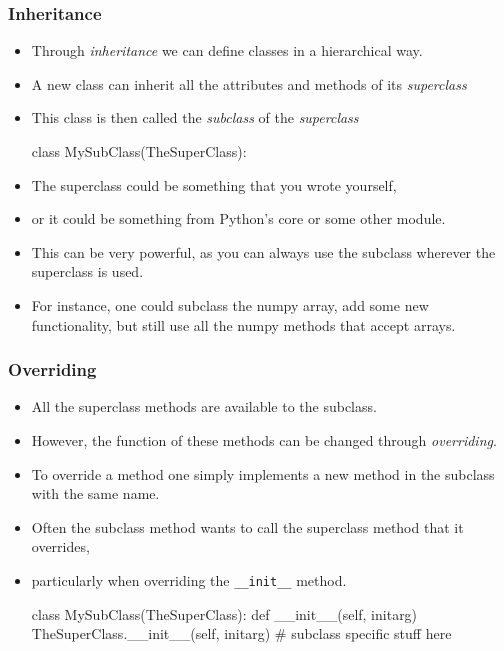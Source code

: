 \documentclass{beamer}
\begin{document}
\begin{frame}[fragile]
\frametitle{Inheritance}
\begin{itemize}
\item Through \emph{inheritance} we can define classes in a hierarchical way.
\item A new class can inherit all the attributes and methods of its \emph{superclass}
\item This class is then called the \emph{subclass} of the \emph{superclass}
\begin{code}
  class MySubClass(TheSuperClass):
\end{code}
\item The superclass could be something that you wrote yourself,
\item or it could be something from Python's core or some other module.
\item This can be very powerful, as you can always use the subclass wherever the superclass is used.
\item For instance, one could subclass the numpy array, add some new functionality, 
but still use all the numpy methods that accept arrays.

\end{itemize}


\end{frame}

\begin{frame}[fragile]
\frametitle{Overriding}

\begin{itemize}
\item All the superclass methods are available to the subclass.
\item However, the function of these methods can be changed through \emph{overriding}.
\item To override a method one simply implements a new method in the subclass with the same name.
\item Often the subclass method wants to call the superclass method that it overrides,
\item particularly when overriding the \lstinline|__init__| method.
\begin{code}
  class MySubClass(TheSuperClass):
    def __init__(self, initarg)
      TheSuperClass.__init__(self, initarg)
      # subclass specific stuff here
\end{code}
\end{itemize}

\end{frame}
\end{document}
